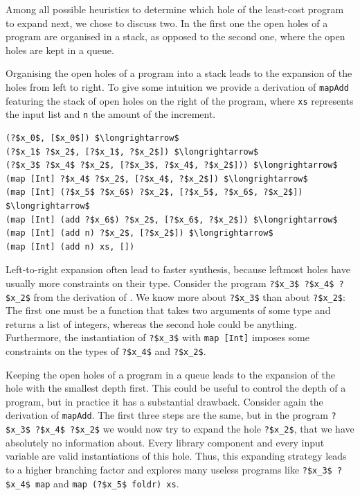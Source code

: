 Among all possible heuristics to determine which hole of the least-cost program to expand next, we chose to discuss two. In the first one the open holes of a program are organised in a stack, as opposed to the second one, where the open holes are kept in a queue.

Organising the open holes of a program into a stack leads to the expansion of the holes from left to right. To give some intuition we provide a derivation of \lstinline?mapAdd? featuring the stack of open holes on the right of the program, where \lstinline?xs? represents the input list and \lstinline?n? the amount of the increment.
\begin{lstlisting}[style=plain]
(?$x_0$, [$x_0$]) $\longrightarrow$
(?$x_1$ ?$x_2$, [?$x_1$, ?$x_2$]) $\longrightarrow$
(?$x_3$ ?$x_4$ ?$x_2$, [?$x_3$, ?$x_4$, ?$x_2$])) $\longrightarrow$
(map [Int] ?$x_4$ ?$x_2$, [?$x_4$, ?$x_2$]) $\longrightarrow$
(map [Int] (?$x_5$ ?$x_6$) ?$x_2$, [?$x_5$, ?$x_6$, ?$x_2$]) $\longrightarrow$
(map [Int] (add ?$x_6$) ?$x_2$, [?$x_6$, ?$x_2$]) $\longrightarrow$
(map [Int] (add n) ?$x_2$, [?$x_2$]) $\longrightarrow$
(map [Int] (add n) xs, [])
\end{lstlisting}
Left-to-right expansion often lead to faster synthesis, because leftmost holes have usually more constraints on their type. Consider the program \lstinline!?$x_3$ ?$x_4$ ?$x_2$! from the derivation of \lstinline??. We know more about \lstinline!?$x_3$! than about \lstinline!?$x_2$!: The first one must be a function that takes two arguments of some type and returns a list of integers, whereas the second hole could be anything. Furthermore, the instantiation of \lstinline!?$x_3$! with \lstinline?map [Int]? imposes some constraints on the types of \lstinline!?$x_4$! and \lstinline!?$x_2$!.

Keeping the open holes of a program in a queue leads to the expansion of the hole with the smallest depth first. This could be useful to control the depth of a program, but in practice it has a substantial drawback. Consider again the derivation of \lstinline?mapAdd?. The first three steps are the same, but in the program \lstinline!?$x_3$ ?$x_4$ ?$x_2$! we would now try to expand the hole \lstinline!?$x_2$!, that we have absolutely no information about. Every library component and every input variable are valid instantiations of this hole. Thus, this expanding strategy leads to a higher branching factor and explores many useless programs like \lstinline!?$x_3$ ?$x_4$ map! and \lstinline!map (?$x_5$ foldr) xs!.

